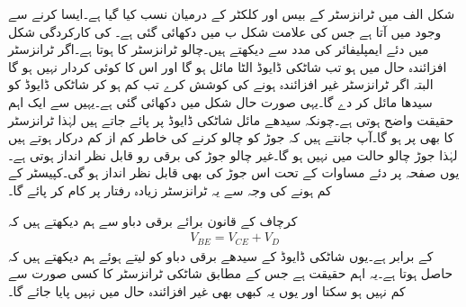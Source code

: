 شکل  الف میں ٹرانزسٹر کے بیس اور کلکٹر  کے درمیان  نسب کیا گیا ہے۔ایسا کرنے سے  وجود میں آتا ہے جس کی علامت شکل  ب میں دکھائی گئی ہے۔ کی کارکردگی شکل  میں دئے ایمپلیفائر کی مدد سے دیکھتے ہیں۔چالو ٹرانزسٹر کا  ہوتا ہے۔اگر ٹرانزسٹر افزائندہ حال میں ہو تب شاٹکی ڈایوڈ الٹا مائل ہو گا اور اس کا کوئی کردار نہیں ہو گا البتہ اگر ٹرانزسٹر غیر افزائندہ ہونے کی کوشش کرے تب   کم ہو کر  شاٹکی ڈایوڈ کو سیدھا مائل کر دے گا۔یہی صورت حال شکل میں دکھائی گئی ہے۔یہیں سے ایک اہم حقیقت واضح ہوتی ہے۔چونکہ سیدھے مائل شاٹکی ڈایوڈ پر  پائے جاتے ہیں لہٰذا ٹرانزسٹر کا  بھی  پر ہو گا۔آپ جانتے ہیں کہ  جوڑ کو چالو کرنے کی خاطر کم از کم  درکار ہوتے ہیں لہٰذا  جوڑ چالو حالت میں نہیں ہو گا۔غیر چالو جوڑ کی برقی رو قابل نظر انداز ہوتی ہے۔یوں صفحہ  پر دئے مساوات  کے تحت اس جوڑ کی  بھی قابل نظر انداز ہو گی۔کپیسٹر کے کم ہونے کی وجہ سے یہ ٹرانزسٹر زیادہ رفتار پر کام کر پائے گا۔

کرچاف کے قانون برائے برقی دباو سے ہم دیکھتے ہیں کہ
\begin{align*}
V_{BE}=V_{CE}+V_D
\end{align*}
کے برابر ہے۔یوں شاٹکی ڈایوڈ کے سیدھے برقی دباو کو  لیتے ہوئے ہم دیکھتے ہیں کہ  حاصل ہوتا ہے۔یہ اہم حقیقت ہے جس کے مطابق شاٹکی ٹرانزسٹر کا  کسی صورت  سے کم نہیں ہو سکتا اور یوں یہ کبھی بھی غیر افزائندہ حال میں نہیں پایا جائے گا۔

